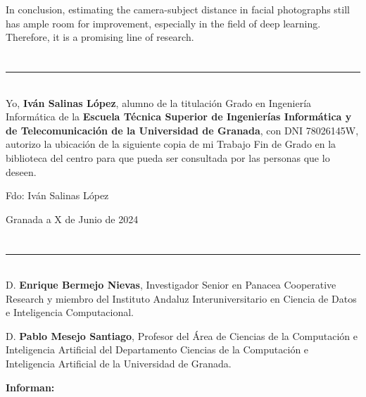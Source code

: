 In conclusion, estimating the camera-subject distance in facial photographs still has ample room for improvement, especially in the field of deep learning. Therefore, it is a promising line of research.

\chapter*{}
\thispagestyle{empty}

\noindent\rule[-1ex]{\textwidth}{2pt}\\[4.5ex]

Yo, \textbf{Iván Salinas López}, alumno de la titulación Grado en Ingeniería Informática de la \textbf{Escuela Técnica Superior de Ingenierías Informática y de Telecomunicación de la Universidad de Granada}, con DNI 78026145W, autorizo la ubicación de la siguiente copia de mi Trabajo Fin de Grado en la biblioteca del centro para que pueda ser consultada por las personas que lo deseen.

\vspace{6cm}

\noindent Fdo: Iván Salinas López

\vspace{2cm}

\begin{flushright}
Granada a X de Junio de 2024
\end{flushright}


\chapter*{}
\thispagestyle{empty}

\noindent\rule[-1ex]{\textwidth}{2pt}\\[4.5ex]

D. \textbf{Enrique Bermejo Nievas}, Investigador Senior en Panacea Cooperative Research y miembro del Instituto Andaluz Interuniversitario en Ciencia de Datos e Inteligencia Computacional.

\vspace{0.5cm}

D. \textbf{Pablo Mesejo Santiago}, Profesor del Área de Ciencias de la Computación e Inteligencia Artificial del Departamento Ciencias de la Computación e Inteligencia Artificial de la Universidad de Granada.


\vspace{0.5cm}

\textbf{Informan:}

\vspace{0.5cm}

